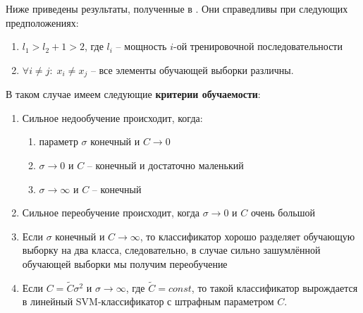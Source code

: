 \documentclass[14pt,a4paper,article]{ncc}
\numberwithin{equation}{subsection}
\begin{document}
Ниже приведены результаты, полученные в \cite{keerthi}	. Они справедливы при следующих предположениях:

\begin{enumerate}
		\item $l_1> l_2 + 1 > 2$, где $l_i$ -- мощность $i$-ой тренировочной последовательности
		\item $\forall i \neq j: \; x_i \neq x_j$ -- все элементы обучающей выборки различны.
\end{enumerate}

В таком случае имеем следующие \textbf{критерии обучаемости}:
\begin{enumerate}
	\item Сильное недообучение происходит, когда:
	\begin{enumerate}
		\item параметр $\sigma$ конечный и $C \rightarrow 0$
		\item $\sigma \rightarrow 0$ и $C$ -- конечный и достаточно маленький
		\item $\sigma \rightarrow \infty$ и $C$ -- конечный
	\end{enumerate}
	
	\item Сильное переобучение происходит, когда $\sigma \rightarrow 0$ и $C$ очень большой
	\item Если $\sigma$ конечный и $C \rightarrow \infty$, то классификатор хорошо разделяет обучающую выборку на два класса, следовательно, в случае сильно зашумлённой обучающей выборки мы получим переобучение
	\item Если $C = \tilde{C} \sigma^2$ и $\sigma \rightarrow \infty$, где $\tilde{C}=const$, то такой классификатор вырождается в линейный SVM-классификатор с штрафным параметром $C$.
\end{enumerate}
\end{document}
